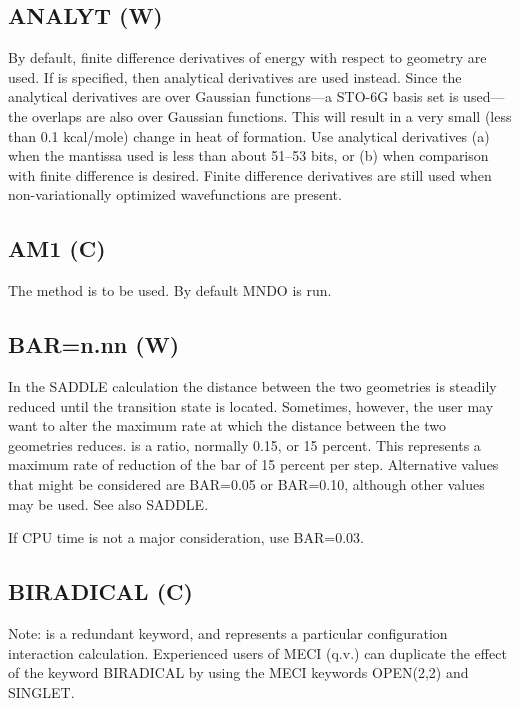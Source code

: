 \subsection*{ANALYT (W)}
      By default, finite difference derivatives of energy with respect  to
 geometry  are  used.  If  is specified, then analytical derivatives
 are used instead.  Since the analytical  derivatives  are  over  Gaussian
 functions---a  STO-6G  basis set is used---the overlaps are also over
 Gaussian functions.  This will result in a  very  small  (less  than  0.1
 kcal/mole)  change  in heat of formation.  Use analytical derivatives (a)
 when the mantissa used is  less  than  about 51--53  bits,  or  (b)  when
 comparison   with   finite  difference  is  desired.   Finite  difference
 derivatives are still used when non-variationally optimized wavefunctions
 are present.


\subsection*{AM1 (C)}
The  method is to be used.  By default MNDO is run.

\subsection*{BAR=n.nn (W)}
In the SADDLE calculation the distance between the two geometries is
   steadily  reduced  until  the  transition  state  is located.  Sometimes,
   however, the user may want  to  alter  the  maximum  rate  at  which  the
   distance  between  the  two geometries reduces.  is a ratio, normally
   0.15, or 15 percent.  This represents a maximum rate of reduction of  the
   bar  of 15 percent per step.  Alternative values that might be considered
   are BAR=0.05 or BAR=0.10, although other values may be  used.   See  also
   SADDLE.

   If CPU time is not a major consideration, use BAR=0.03.


                                 
\subsection*{BIRADICAL (C)}
   Note:  is a redundant keyword, and represents a particular
   configuration  interaction calculation.  Experienced users of MECI (q.v.)
   can duplicate the effect of the  keyword  BIRADICAL  by  using  the  MECI
   keywords OPEN(2,2) and SINGLET.

